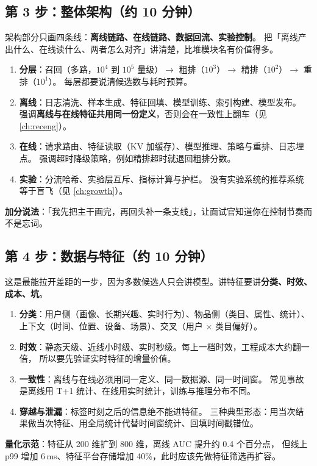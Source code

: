 \subsection{第 3 步：整体架构（约 10 分钟）}

架构部分只画四条线：\textbf{离线链路、在线链路、数据回流、实验控制}。
把「离线产出什么、在线读什么、两者怎么对齐」讲清楚，比堆模块名有价值得多。

\begin{interview}[架构讲解的四个必答点]
\begin{enumerate}
  \item \textbf{分层}：召回（多路，$10^4$ 到 $10^5$ 量级）$\to$ 粗排（$10^3$）$\to$ 精排（$10^2$）$\to$ 重排（$10^1$）。
        每层都要说清候选数与耗时预算。
  \item \textbf{离线}：日志清洗、样本生成、特征回填、模型训练、索引构建、模型发布。
        强调\textbf{离线与在线特征共用同一份定义}，否则会在一致性上翻车（见 \cref{ch:receng}）。
  \item \textbf{在线}：请求路由、特征读取（KV 加缓存）、模型推理、策略与重排、日志埋点。
        强调超时降级策略，例如精排超时就退回粗排分数。
  \item \textbf{实验}：分流哈希、实验层互斥、指标计算与护栏。
        没有实验系统的推荐系统等于盲飞（见 \cref{ch:growth}）。
\end{enumerate}
\textbf{加分说法}：「我先把主干画完，再回头补一条支线」，让面试官知道你在控制节奏而不是忘词。
\end{interview}

\subsection{第 4 步：数据与特征（约 10 分钟）}

这是最能拉开差距的一步，因为多数候选人只会讲模型。讲特征要讲\textbf{分类、时效、成本、坑}。

\begin{interview}[特征体系的四个维度]
\begin{enumerate}
  \item \textbf{分类}：用户侧（画像、长期兴趣、实时行为）、物品侧（类目、属性、统计）、
        上下文（时间、位置、设备、场景）、交叉（用户 $\times$ 类目偏好）。
  \item \textbf{时效}：静态天级、近线小时级、实时秒级。每上一档时效，工程成本大约翻一倍，
        所以要先验证实时特征的增量价值。
  \item \textbf{一致性}：离线与在线必须用同一定义、同一数据源、同一时间窗。
        常见事故是离线用 T+1 统计、在线用实时统计，训练与推理分布不同。
  \item \textbf{穿越与泄漏}：标签时刻之后的信息绝不能进特征。
        三种典型形态：用当次结果做当次特征、用全局统计代替时间窗统计、回填时间戳错位。
\end{enumerate}
\textbf{量化示范}：特征从 200 维扩到 800 维，离线 AUC 提升约 0.4 个百分点，
但线上 p99 增加 6\,ms、特征平台存储增加 40\%，此时应该先做特征筛选再扩容。
\end{interview}

